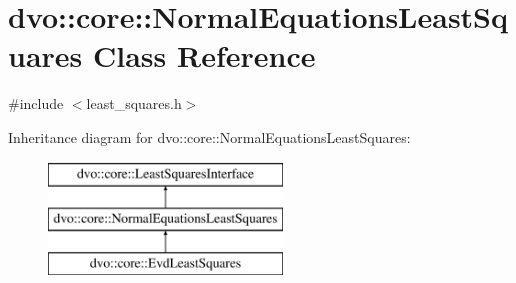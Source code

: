 \hypertarget{classdvo_1_1core_1_1_normal_equations_least_squares}{}\section{dvo\+:\+:core\+:\+:Normal\+Equations\+Least\+Squares Class Reference}
\label{classdvo_1_1core_1_1_normal_equations_least_squares}


{\ttfamily \#include $<$least\+\_\+squares.\+h$>$}

Inheritance diagram for dvo\+:\+:core\+:\+:Normal\+Equations\+Least\+Squares\+:\begin{figure}[H]
\begin{center}
\leavevmode
\includegraphics[height=3.000000cm]{classdvo_1_1core_1_1_normal_equations_least_squares}
\end{center}
\end{figure}
